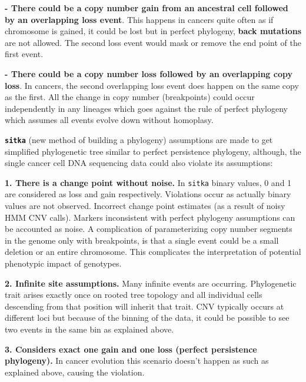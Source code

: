 \textbf{- There could be a copy number gain from an ancestral cell followed  by an overlapping loss event}. This happens in cancers quite often as if chromosome is gained, it could be lost but in perfect phylogeny, \textbf{back mutations} are not allowed. The second loss event would mask or remove the end point of the first event.

\textbf{- There could be a copy number loss followed by an overlapping copy loss}. In cancers, the second overlapping loss event does happen on the same copy as the first. 
All the change in copy number (breakpoints) could occur independently in any lineages which goes against the rule of perfect phylogeny which assumes all events evolve down without homoplasy.  

 \textbf{\texttt{sitka}} (new method of building a phylogeny) assumptions are made to get simplified phylogenetic tree similar to perfect persistence phylogeny, although, the single cancer cell DNA sequencing data could also violate its assumptions:

\textbf{1. There is a change point without noise.} In \texttt{sitka} binary values, 0 and 1 are considered as loss and gain respectively. Violations occur as actually binary values are not observed. Incorrect change point estimates (as a result of noisy HMM CNV calls). 
Markers inconsistent with perfect phylogeny assumptions can be accounted as noise. A complication of parameterizing copy number segments in the genome only with breakpoints, is that a single event could be a small deletion or an entire chromosome. This complicates the interpretation of potential phenotypic impact of genotypes. 


\textbf{2. Infinite site assumptions.} Many infinite events are occurring. Phylogenetic trait arises exactly once on rooted tree topology and all individual cells descending from that position will inherit that trait.
CNV typically occurs at different loci but because of the binning of the data, it could be possible to see two events in the same bin as explained above.

\textbf{3. Considers exact one gain and one loss (perfect persistence phylogeny).} In cancer evolution this scenario doesn't happen as such as explained above, causing the violation.



 
 
 

